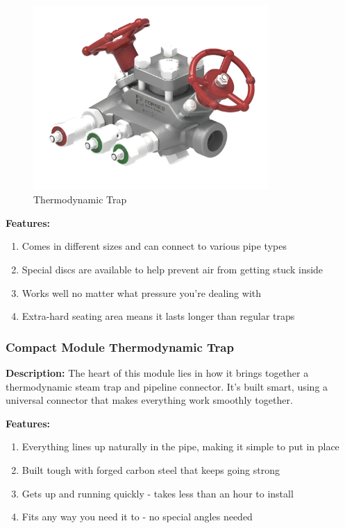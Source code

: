 \begin{figure}[h]
    \centering
    \includegraphics[width=0.8\textwidth,height=0.33\textheight,keepaspectratio]{figs/lastmin/thermodynamic_trap.png}
    \caption{Thermodynamic Trap}
    \label{fig:thermodynamic_trap}
\end{figure}

\textbf{Features:}
\begin{enumerate}
    \item Comes in different sizes and can connect to various pipe types
    \item Special discs are available to help prevent air from getting stuck inside
    \item Works well no matter what pressure you’re dealing with
    \item Extra-hard seating area means it lasts longer than regular traps
\end{enumerate}

\subsubsection{Compact Module Thermodynamic Trap}
\textbf{Description:} The heart of this module lies in how it brings together a thermodynamic steam trap and pipeline connector. It’s built smart, using a universal connector that makes everything work smoothly together.

\textbf{Features:}
\begin{enumerate}
    \item Everything lines up naturally in the pipe, making it simple to put in place
    \item Built tough with forged carbon steel that keeps going strong
    \item Gets up and running quickly - takes less than an hour to install
    \item Fits any way you need it to - no special angles needed
\end{enumerate}

